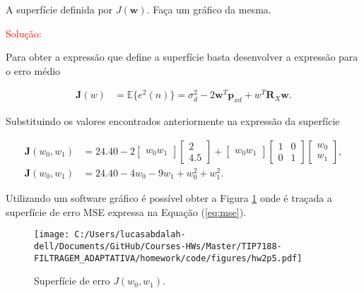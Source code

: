 A superfície definida por $J(\mathbf{w})$. Faça um gráfico da mesma.

\textcolor{red}{Solução:}

Para obter a expressão que define a superfície basta desenvolver a expressão para o erro médio

\begin{align}
    \mathbf{J}(w) &= \mathbb{E}\{e^{2}(n)\} = \sigma^{2}_{d} - 2\mathbf{w}^{T}\mathbf{p}_{xd} + w^{T}\mathbf{R}_{X}\mathbf{w}. \label{eq:mse}   
\end{align}

Substituindo os valores encontrados anteriormente na expressão da superfície

\begin{align}
    \mathbf{J}(w_{0}, w_{1}) &= 24.40 - 2 \left[ \begin{matrix} w_{0}  w_{1} \end{matrix} \right] \left[ \begin{matrix} 2 \\ 4.5 \end{matrix} \right] + \left[ \begin{matrix} w_{0}  w_{1} \end{matrix} \right] \left[ \begin{matrix} 1 & 0 \\ 0 & 1 \end{matrix} \right]  \left[ \begin{matrix} w_{0}  \\ w_{1} \end{matrix} \right], \\
    \mathbf{J}(w_{0},w_{1}) &= 24.40 - 4w_{0} - 9w_{1} + w^{2}_{0} + w^{2}_{1}.
\end{align}

Utilizando um software gráfico é possível obter a Figura \ref{fig:hw2p5} onde é traçada a superfície de erro MSE expressa na Equação (\ref{eq:mse}).

\begin{figure}[!htb]
    \centering
    \texttt{[image: C:/Users/lucasabdalah-dell/Documents/GitHub/Courses-HWs/Master/TIP7188-FILTRAGEM\_ADAPTATIVA/homework/code/figures/hw2p5.pdf]}
    \caption{Superfície de erro $J(w_{0}, w_{1})$.}
    \label{fig:hw2p5}
\end{figure}
